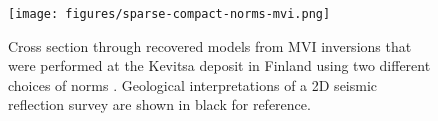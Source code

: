 \begin{figure}[!htb]
    \begin{center}
    \texttt{[image: figures/sparse-compact-norms-mvi.png]}
    \end{center}
\caption{
Cross section through recovered models from MVI inversions that were performed at the Kevitsa deposit in Finland using two different choices of norms \citep{fournier_sparse_2020}. Geological interpretations of a 2D seismic reflection survey are shown in black for reference.
}
\label{fig:sparse-compact-norms-mvi}
\end{figure}
